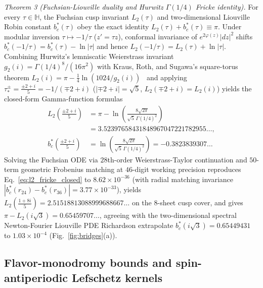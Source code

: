 \documentclass[aps,prd,twocolumn,nofootinbib,floatfix]{revtex4-2}
\begin{document}
\emph{Theorem 3 (Fuchsian-Liouville duality and Hurwitz $\Gamma(1/4)$ Fricke identity).}
For every $\tau \in \mathbb{H}$, the Fuchsian cusp invariant $L_2(\tau)$ and two-dimensional Liouville Robin constant $b_c^*(\tau)$ obey the exact identity $L_2(\tau) + b_c^*(\tau) \equiv \pi$.
Under modular inversion $\tau \mapsto -1/\tau$ ($z' = \tau z$), conformal invariance of $e^{2\varphi(z)}|dz|^2$ shifts $b_c^*(-1/\tau) = b_c^*(\tau) - \ln|\tau|$ and hence $L_2(-1/\tau) = L_2(\tau) + \ln|\tau|$.
Combining Hurwitz's lemniscatic Weierstrass invariant $g_2(i) = \Gamma(1/4)^8/(16\pi^2)$ with Kraus, Roth, and Sugawa's square-torus theorem $L_2(i) = \pi - \frac{1}{4}\ln(1024/g_2(i))$~\cite{KrausRothSugawa2011} and applying $\tau_*^\pm = \frac{\pm 2 + i}{5} = -1/(\mp 2 + i)$ ($|\mp 2 + i| = \sqrt{5}$, $L_2(\mp 2 + i) = L_2(i)$) yields the closed-form Gamma-function formulas
\begin{align}
\label{eq:l2_fricke_closed}
L_2\!\left(\frac{\pm 2 + i}{5}\right) &= \pi - \ln\!\left(\frac{8\sqrt{2\pi}}{\sqrt{5}\,\Gamma(1/4)^2}\right) \nonumber\\
&= 3.52397658431848967047221782955\dots, \nonumber\\
b_c^*\!\left(\frac{\pm 2 + i}{5}\right) &= \ln\!\left(\frac{8\sqrt{2\pi}}{\sqrt{5}\,\Gamma(1/4)^2}\right) = -0.3823839307\dots
\end{align}
Solving the Fuchsian ODE via $28$th-order Weierstrass-Taylor continuation and $50$-term geometric Frobenius matching at $46$-digit working precision reproduces Eq.~\eqref{eq:l2_fricke_closed} to $8.62\times 10^{-36}$ (with radial matching invariance $|b_c^*(r_{24}) - b_c^*(r_{36})| = 3.77\times 10^{-33}$), yields $L_2(\frac{1+8i}{5}) = 2.51518813088999688667\dots$ on the $8$-sheet cusp cover, and gives $\pi - L_2(i\sqrt{3}) = 0.65459707\dots$, agreeing with the two-dimensional spectral Newton-Fourier Liouville PDE Richardson extrapolate $b_c^*(i\sqrt{3}) = 0.65449431$ to $1.03\times 10^{-4}$ (Fig.~\ref{fig:bridges}(a)).

\subsection{Flavor-monodromy bounds and spin-antiperiodic Lefschetz kernels}
\end{document}

